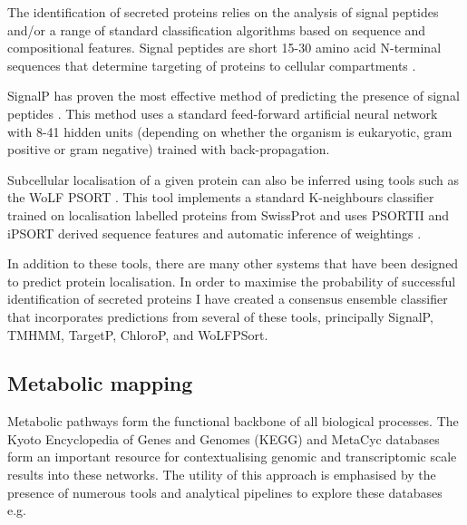 
The identification of secreted proteins relies on the analysis
of signal peptides and/or a range of standard classification
algorithms based on sequence and compositional features.   
Signal peptides are short 15-30 amino acid N-terminal sequences
that determine targeting of proteins to cellular compartments
\citep{Schatz1996,Rusch1995}.

SignalP \citep{Nielsen1997} has proven the most effective method of predicting
the presence of signal peptides \citep{Lee2009a,Petersen2011}.
This method uses a standard feed-forward artificial neural network
with 8-41 hidden units (depending on whether the organism is eukaryotic, 
gram positive or gram negative) trained with back-propagation.

Subcellular localisation of a given protein can also be inferred
using tools such as the WoLF PSORT \citep{Horton2007a}.
This tool implements a standard K-neighbours classifier
trained on localisation labelled proteins from SwissProt 
and uses PSORTII \citep{Nakai1992,Nakai1999,Horton1997} and iPSORT \citep{Bannai2002} 
derived sequence features and automatic inference of weightings \citep{Horton2006}. 

In addition to these tools, there are many other systems that have been
designed to predict protein localisation.  In order to maximise
the probability of successful identification of secreted proteins I have
created a consensus ensemble classifier that incorporates predictions from 
several of these tools, principally SignalP, TMHMM, TargetP, ChloroP, and WoLFPSort. 
%
%
%
%

\subsection{Metabolic mapping}

Metabolic pathways form the functional backbone of all biological processes. 
The Kyoto Encyclopedia of Genes and Genomes (KEGG) \citep{Ogata1999,Okuda2008,Kanehisa2014} 
and MetaCyc \citep{Caspi2007} databases form an important resource for contextualising
genomic and transcriptomic scale results into these networks. 
The utility of this approach is emphasised by the presence of numerous
tools and analytical pipelines to explore these databases 
e.g. \citep{Okuda2008,Nakao1999,Karp2002,Karp2010,Antonov2008,Klukas2007}

